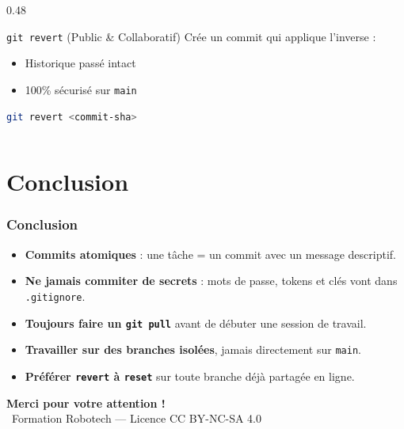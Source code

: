 \documentclass[
	11pt,
	aspectratio=169
]{beamer}
\begin{document}
\begin{frame}[fragile]
\begin{columns}[t]
        \begin{column}{0.48\textwidth}
            \begin{block}{\footnotesize \texttt{git revert} (Public \& Collaboratif)}
                \scriptsize
                Crée un commit qui applique l'inverse :
                \begin{itemize}
                    \item Historique passé intact
                    \item 100\% sécurisé sur \texttt{main}
                \end{itemize}
\begin{lstlisting}[language=bash]
git revert <commit-sha>
\end{lstlisting}
            \end{block}
        \end{column}
    \end{columns}
\end{frame}

\section{Conclusion}

\begin{frame}
    \frametitle{Conclusion}
    \begin{itemize}
        \item \textbf{Commits atomiques} : une tâche = un commit avec un message descriptif.
        \item \textbf{Ne jamais commiter de secrets} : mots de passe, tokens et clés vont dans \texttt{.gitignore}.
        \item \textbf{Toujours faire un \texttt{git pull}} avant de débuter une session de travail.
        \item \textbf{Travailler sur des branches isolées}, jamais directement sur \texttt{main}.
        \item \textbf{Préférer \texttt{revert} à \texttt{reset}} sur toute branche déjà partagée en ligne.
    \end{itemize}

    \vfill
    \begin{center}
        \Huge \textbf{Merci pour votre attention !} \\
        \bigskip
        \small \ccbyncsa\ Formation Robotech --- Licence CC BY-NC-SA 4.0
    \end{center}
\end{frame}
\end{document}
